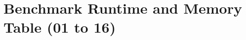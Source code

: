\documentclass[11pt]{article}
\begin{document}
\section*{Benchmark Runtime and Memory Table (01 to 16)}

\end{document}
